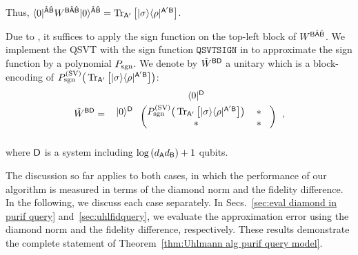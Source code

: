 Thus, $\langle0|^{\hat{{\mathsf{A}}}\hat{{\mathsf{B}}}}W^{{\mathsf{B}}\hat{{\mathsf{A}}}\hat{{\mathsf{B}}}}|0\rangle^{\hat{{\mathsf{A}}}\hat{{\mathsf{B}}}} = \operatorname{Tr}_{{\mathsf{A}}'}\big[|\sigma\rangle\langle\rho|^{{\mathsf{A}}'{\mathsf{B}}}\big]$.



Due to , it suffices to apply the sign function on the top-left block of $W^{{\mathsf{B}}\hat{{\mathsf{A}}}\hat{{\mathsf{B}}}}$.
We implement the QSVT with the sign function $\mathtt{QSVTSIGN}$ in  to approximate the sign function by a polynomial $P_{\mathrm{sgn}}$.
We denote by $\tilde{W}^{{\mathsf{B}}{\mathsf{D}}}$ a unitary which is a block-encoding of $P_{\mathrm{sgn}}^{(\rm SV)}\big(\operatorname{Tr}_{{\mathsf{A}}'}\big[|\sigma\rangle\langle\rho|^{{\mathsf{A}}'{\mathsf{B}}}\big]\big)$:
\begin{align}
\label{eq:block tildeW fidelity}
    \til{W}^{\sB\sD}
    = \hspace{1mm}
\begin{blockarray}{ccc}
& \bra{0}^{\sD}&  & \vspace{1mm}\\
\begin{block}{c(cc)}
  \ket{0}^{\sD} \hspace*{1mm} & P_\sgn^{(\rm SV)}\big(\tr_{\sA'}\big[\ketbra{\sigma}{\rho}^{\sA'\sB}\big]\big) & \hspace{0mm} * \hspace{3mm}\\
   \hspace*{1mm} & * & \hspace{0mm} * \hspace{3mm}\\
\end{block}
\end{blockarray}\hspace{2.5mm}, 
\end{align}
where ${\mathsf{D}}$ is a system including $\log{(d_{\mathsf{A}}d_{\mathsf{B}})} + 1$ qubits.



The discussion so far applies to both cases, in which the performance of our algorithm is measured in terms of the diamond norm and the fidelity difference.
In the following, we discuss each case separately.
In Secs.~\ref{sec:eval diamond in purif query} and~\ref{sec:uhlfidquery}, we evaluate the approximation error using the diamond norm and the fidelity difference, respectively.
These results demonstrate the complete statement of Theorem~\ref{thm:Uhlmann alg purif query model}.





